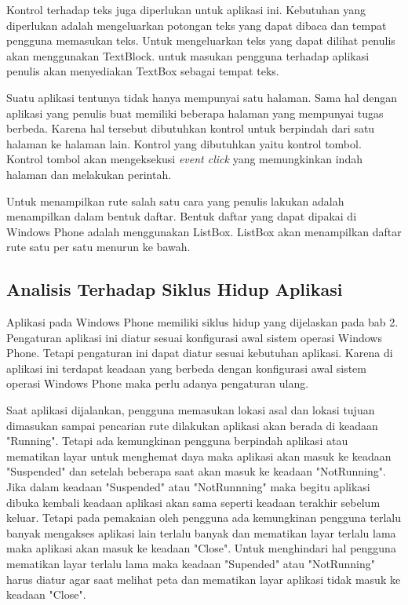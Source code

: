 \hspace{0.5cm} Kontrol terhadap teks juga diperlukan untuk aplikasi ini. Kebutuhan yang diperlukan adalah mengeluarkan potongan teks yang dapat dibaca dan tempat pengguna memasukan teks. Untuk mengeluarkan teks yang dapat dilihat penulis akan menggunakan TextBlock. untuk masukan pengguna terhadap aplikasi penulis akan menyediakan TextBox sebagai tempat teks.

\hspace{0.5cm} Suatu aplikasi tentunya tidak hanya mempunyai satu halaman. Sama hal dengan aplikasi yang penulis buat memiliki beberapa halaman yang mempunyai tugas berbeda. Karena hal tersebut dibutuhkan kontrol untuk berpindah dari satu halaman ke halaman lain. Kontrol yang dibutuhkan yaitu kontrol tombol. Kontrol tombol akan mengeksekusi \textit{event click} yang memungkinkan indah halaman dan melakukan perintah.  

\hspace{0.5cm} Untuk menampilkan rute salah satu cara yang penulis lakukan adalah menampilkan dalam bentuk daftar. Bentuk daftar yang dapat dipakai di Windows Phone adalah menggunakan ListBox. ListBox akan menampilkan daftar rute satu per satu menurun ke bawah.

\subsection{Analisis Terhadap Siklus Hidup Aplikasi}
\label{lab:Analisis Terhadap Siklus Hidup Aplikasi}
\hspace{0.5cm} Aplikasi pada Windows Phone memiliki siklus hidup yang dijelaskan pada bab 2. Pengaturan aplikasi ini diatur sesuai konfigurasi awal sistem operasi Windows Phone. Tetapi pengaturan ini dapat diatur sesuai kebutuhan aplikasi. Karena di aplikasi ini terdapat keadaan yang berbeda dengan konfigurasi awal sistem operasi Windows Phone maka perlu adanya pengaturan ulang.

\hspace{0.5cm} Saat aplikasi dijalankan, pengguna memasukan lokasi asal dan lokasi tujuan dimasukan sampai pencarian rute dilakukan aplikasi akan berada di keadaan "Running". Tetapi ada kemungkinan pengguna berpindah aplikasi atau mematikan layar untuk menghemat daya maka aplikasi akan masuk ke keadaan "Suspended" dan setelah beberapa saat akan masuk ke keadaan "NotRunning". Jika dalam keadaan "Suspended" atau "NotRunnning" maka begitu aplikasi dibuka kembali keadaan aplikasi akan sama seperti keadaan terakhir sebelum keluar. Tetapi pada pemakaian oleh pengguna ada kemungkinan pengguna terlalu banyak mengakses aplikasi lain terlalu banyak dan mematikan layar terlalu lama maka aplikasi akan masuk ke keadaan "Close". Untuk menghindari hal pengguna mematikan layar terlalu lama maka keadaan "Supended" atau "NotRunning" harus diatur agar saat melihat peta dan mematikan layar aplikasi tidak masuk ke keadaan "Close". 

